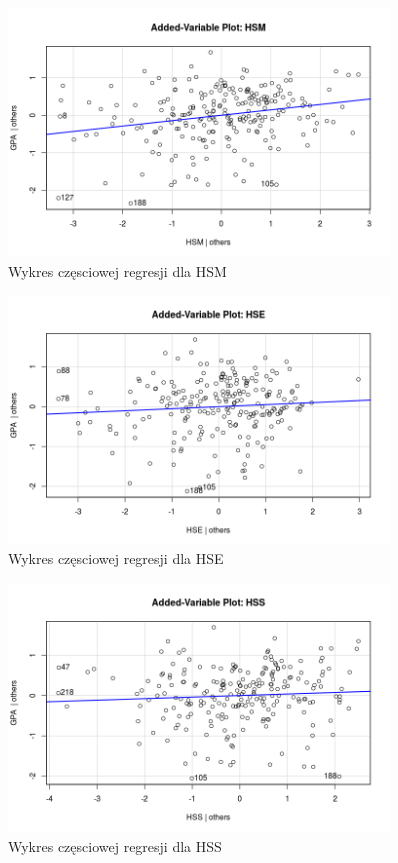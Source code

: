 \documentclass[9pt]{article}  %
\begin{document}
    
    \begin{figure}[H]
      \centering
      \includegraphics[width=0.9\textwidth]{123.png}
      \caption{Wykres częsciowej regresji dla HSM}
    \end{figure}


    \begin{figure}[H]
      \centering
      \includegraphics[width=0.9\textwidth]{124.png}
      \caption{Wykres częsciowej regresji dla HSE}
    \end{figure}
    
    
    \begin{figure}[H]
      \centering
      \includegraphics[width=0.9\textwidth]{125.png}
      \caption{Wykres częsciowej regresji dla HSS}
    \end{figure}
    
\end{document}
